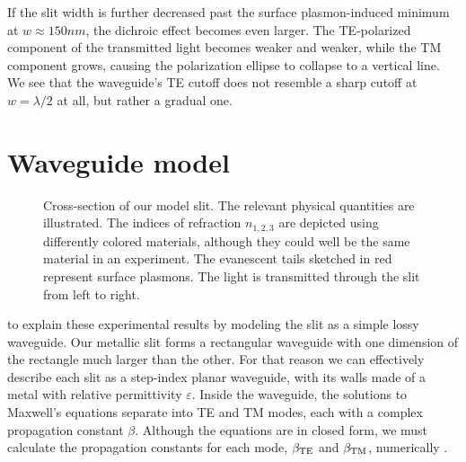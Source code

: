 If the slit width is further decreased past the surface plas\-mon-in\-duced minimum at $w\approx 150\unit{nm}$, the dichroic effect becomes even larger.
The \gls{TE}-polarized component of the transmitted light becomes weaker and weaker, while the \gls{TM} component grows, causing the polarization ellipse to collapse to a vertical line.
We see that the waveguide's \gls{TE} cutoff does not resemble a sharp cutoff at $w=\lambda/2$ at all, but rather a gradual one.

\section{Waveguide model}
\label{qwp:sec:waveguide-model}
%
\begin{figure}[tb]
\caption{Cross-section of our model slit.
The relevant physical quantities are illustrated.
The indices of refraction $n_{1,2,3}$ are depicted using differently colored materials, although they could well be the same material in an experiment.
The evanescent tails sketched in red represent surface plasmons.
The light is transmitted through the slit from left to right.}
\label{fig:geometry}
\end{figure}
%
 to explain these experimental results by modeling the slit as a simple lossy waveguide.
Our metallic slit forms a rectangular waveguide with one dimension of the rectangle much larger than the other.
For that reason we can effectively describe each slit as a step-index planar waveguide, with its walls made of a metal with relative permittivity $\varepsilon$.
Inside the waveguide, the solutions to Maxwell's equations separate into \gls{TE} and \gls{TM} modes, each with a complex propagation constant $\beta$.
Although the equations are in closed form, we must calculate the propagation constants for each mode, $\beta_{\text{TE}}$ and $\beta_{\text{TM}}$, numerically \cite{SnyderLove}.

